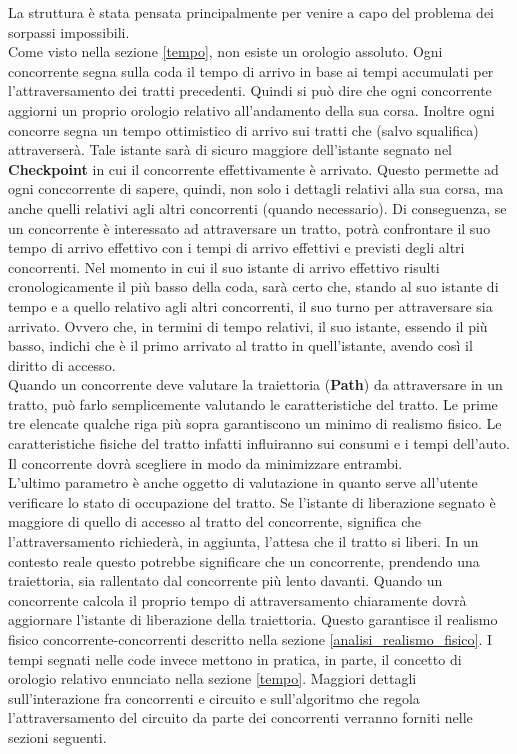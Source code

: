 La struttura è stata pensata principalmente per venire a capo del problema dei
sorpassi impossibili.\\
Come visto nella sezione \ref{tempo}, non esiste un orologio assoluto. Ogni
concorrente segna sulla
coda il tempo di arrivo in base ai tempi accumulati per l'attraversamento dei
tratti precedenti. Quindi si può dire che ogni
concorrente aggiorni un proprio orologio relativo all'andamento della sua corsa.
Inoltre ogni concorre segna
un tempo ottimistico di arrivo sui tratti che (salvo squalifica) attraverserà.
Tale istante sarà di sicuro maggiore dell'istante segnato
nel \textbf{Checkpoint} in cui il concorrente effettivamente è arrivato. Questo
permette ad ogni conccorrente di sapere, quindi, non solo
i dettagli relativi alla sua corsa, ma anche quelli relativi agli altri
concorrenti (quando necessario). Di conseguenza, se un concorrente
è interessato ad attraversare un tratto, potrà confrontare il suo tempo di
arrivo effettivo con i tempi di arrivo effettivi e previsti
degli altri concorrenti. Nel momento in cui il suo istante di arrivo effettivo
risulti cronologicamente il più basso della coda, sarà certo
che, stando al suo istante di tempo e a quello relativo agli altri concorrenti,
il suo turno per attraversare sia arrivato. Ovvero che, in 
termini di tempo relativi, il suo istante, essendo il più basso, indichi che è
il primo arrivato al tratto in quell'istante, avendo così
il diritto di accesso.\\
Quando un concorrente deve valutare la traiettoria (\textbf{Path}) da
attraversare in un tratto, può farlo semplicemente valutando le caratteristiche
del tratto. Le prime tre elencate qualche riga più sopra garantiscono un minimo
di realismo fisico. Le caratteristiche fisiche del tratto infatti
influiranno sui consumi e i tempi dell'auto. Il concorrente dovrà scegliere in
modo da minimizzare entrambi.\\
L'ultimo parametro è anche oggetto di valutazione in quanto serve all'utente
verificare lo stato di occupazione del tratto. Se l'istante
di liberazione segnato è maggiore di quello di accesso al tratto del
concorrente, significa che l'attraversamento richiederà, in aggiunta, 
l'attesa che il tratto si liberi. In un contesto reale questo potrebbe
significare che un concorrente, prendendo una traiettoria, sia rallentato
dal concorrente più lento davanti. Quando un concorrente calcola il proprio
tempo di attraversamento chiaramente dovrà aggiornare l'istante
di liberazione della traiettoria. Questo garantisce il realismo fisico
concorrente-concorrenti descritto nella sezione \ref{analisi_realismo_fisico}.
I tempi segnati nelle code invece mettono in pratica, in parte, il concetto di
orologio relativo enunciato nella sezione \ref{tempo}.
Maggiori dettagli sull'interazione fra concorrenti e circuito e sull'algoritmo
che regola l'attraversamento del circuito da parte dei concorrenti
verranno forniti nelle sezioni seguenti.
